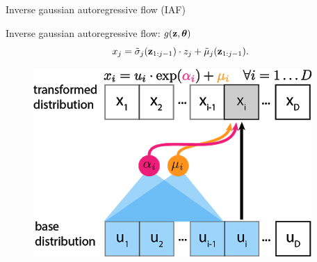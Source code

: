 \begin{frame}{Inverse gaussian autoregressive flow (IAF)}
	\begin{minipage}[t]{0.65\columnwidth}
		\begin{block}{Inverse gaussian autoregressive flow: $g(\mathbf{z}, \boldsymbol{\theta})$}
			\vspace{-0.3cm}
			\[
			x_j = \tilde{\sigma}_j (\mathbf{z}_{1:j-1}) \cdot z_j + \tilde{\mu}_j(\mathbf{z}_{1:j-1}).
			\]
		\end{block}
	\end{minipage}%
	\begin{minipage}[t]{0.35\columnwidth}
		\begin{figure}[h]
			\centering
			\includegraphics[width=.9\linewidth]{figs/af_iaf_explained_3.png}
		\end{figure}
	\end{minipage}
	
\end{frame}
